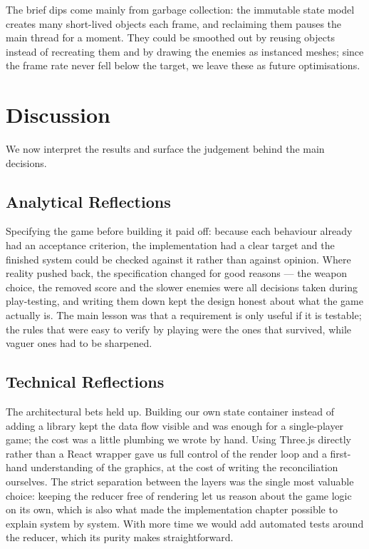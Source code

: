 \documentclass[12pt,a4paper]{report}
\begin{document}
The brief dips come mainly from garbage collection: the immutable state model
creates many short-lived objects each frame, and reclaiming them pauses the main
thread for a moment. They could be smoothed out by reusing objects instead of
recreating them and by drawing the enemies as instanced meshes; since the frame
rate never fell below the target, we leave these as future optimisations.

\section{Discussion}

We now interpret the results and surface the judgement behind the main
decisions.

\subsection{Analytical Reflections}

Specifying the game before building it paid off: because each behaviour already
had an acceptance criterion, the implementation had a clear target and the
finished system could be checked against it rather than against opinion. Where
reality pushed back, the specification changed for good reasons --- the weapon
choice, the removed score and the slower enemies were all decisions taken during
play-testing, and writing them down kept the design honest about what the game
actually is. The main lesson was that a requirement is only useful if it is
testable; the rules that were easy to verify by playing were the ones that
survived, while vaguer ones had to be sharpened.

\subsection{Technical Reflections}

The architectural bets held up. Building our own state container instead of
adding a library kept the data flow visible and was enough for a single-player
game; the cost was a little plumbing we wrote by hand. Using Three.js directly
rather than a React wrapper gave us full control of the render loop and a
first-hand understanding of the graphics, at the cost of writing the
reconciliation ourselves. The strict separation between the layers was the single
most valuable choice: keeping the reducer free of rendering let us reason about
the game logic on its own, which is also what made the implementation chapter
possible to explain system by system. With more time we would add automated
tests around the reducer, which its purity makes straightforward.
\end{document}

